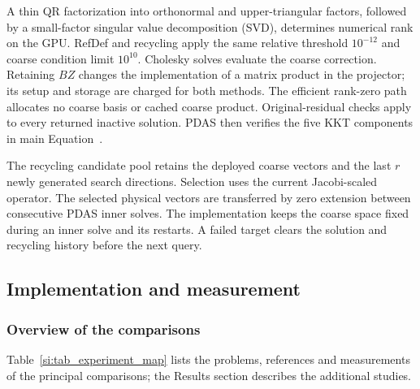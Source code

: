 A thin QR factorization into orthonormal and upper-triangular factors,
followed by a small-factor singular value decomposition (SVD),
determines numerical rank on the GPU.
RefDef and recycling apply the same relative threshold
$10^{-12}$ and coarse condition limit $10^{10}$.
Cholesky solves evaluate the coarse correction. Retaining $BZ$
changes the implementation of a matrix product in the projector;
its setup and storage are charged for both methods. The efficient
rank-zero path allocates no coarse basis or cached coarse product.
Original-residual checks apply to every returned inactive solution.
PDAS then verifies the five KKT components in main
Equation~.

The recycling candidate pool retains the deployed coarse vectors
and the last $r$ newly generated search directions. Selection uses
the current Jacobi-scaled operator. The selected physical vectors
are transferred by zero extension between consecutive PDAS inner
solves. The implementation keeps the coarse space fixed during
an inner solve and its restarts. A failed target clears the
solution and recycling history before the next query.

\subsection{Implementation and measurement}
\subsubsection{Overview of the comparisons}
Table~\ref{si:tab_experiment_map} lists the problems, references and measurements of
the principal comparisons; the Results section describes the additional studies.

